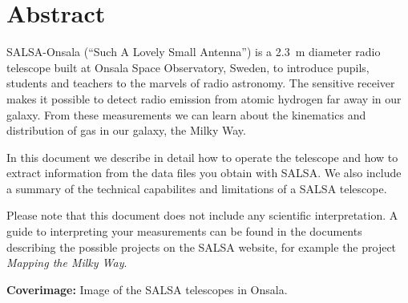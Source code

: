 \chapter*{Abstract}
SALSA-Onsala (``Such A Lovely Small Antenna'') is a 2.3~m diameter radio
telescope built at Onsala Space Observatory, Sweden, to introduce pupils,
students and teachers to the marvels of radio astronomy.  The sensitive
receiver makes it possible to detect radio emission from atomic hydrogen far
away in our galaxy. From these measurements we can learn about the kinematics
and distribution of gas in our galaxy, the Milky Way.

In this document we describe in detail how to operate the telescope
and how to extract information from the data files you obtain with SALSA.
We also include a summary of the technical capabilites and limitations
of a SALSA telescope.

Please note that this document does not include any scientific interpretation.
A guide to interpreting your measurements can be found in the documents 
describing the possible projects on the SALSA website, for example the project
\emph{Mapping the Milky Way}.

\vspace{9cm}




{\bf Coverimage:} Image of the SALSA telescopes in Onsala.
